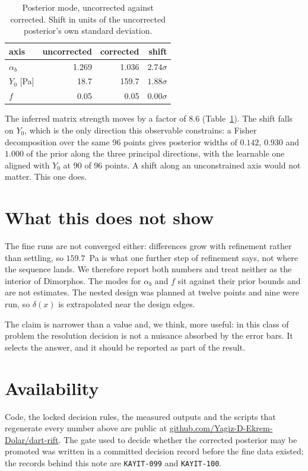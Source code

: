 \documentclass[10pt,twocolumn]{article}
\begin{document}
\begin{table}[t]
\centering\small
\caption{Posterior mode, uncorrected against corrected. Shift in units
of the uncorrected posterior's own standard deviation.}
\label{tab:mode}
\begin{tabular}{lrrr}
\toprule
axis & uncorrected & corrected & shift \\
\midrule
$\alpha_b$          & 1.269 & 1.036 & $2.74\sigma$ \\
$Y_0$ [Pa]          & 18.7  & 159.7 & $1.88\sigma$ \\
$f$                 & 0.05  & 0.05  & $0.00\sigma$ \\
\bottomrule
\end{tabular}
\end{table}

The inferred matrix strength moves by a factor of $8.6$
(Table~\ref{tab:mode}). The shift falls on $Y_0$, which is the only
direction this observable constrains: a Fisher decomposition over the
same 96 points gives posterior widths of $0.142$, $0.930$ and $1.000$
of the prior along the three principal directions, with the learnable
one aligned with $Y_0$ at $90$ of $96$ points. A shift along an
unconstrained axis would not matter. This one does.

\section{What this does not show}

The fine runs are not converged either: differences grow with
refinement rather than settling, so $159.7$~Pa is what one further
step of refinement says, not where the sequence lands. We therefore
report both numbers and treat neither as the interior of Dimorphos.
The modes for $\alpha_b$ and $f$ sit against their prior bounds and
are not estimates. The nested design was planned at twelve points and
nine were run, so $\delta(x)$ is extrapolated near the design edges.

The claim is narrower than a value and, we think, more useful: in this
class of problem the resolution decision is not a nuisance absorbed by
the error bars. It selects the answer, and it should be reported as
part of the result.

\section{Availability}

Code, the locked decision rules, the measured outputs and the scripts
that regenerate every number above are public at
\href{https://github.com/Yagiz-D-Ekrem-Dolar/dart-rift}{github.com/Yagiz-D-Ekrem-Dolar/dart-rift}.
The gate used to decide whether the corrected posterior may be
promoted was written in a committed decision record before the fine
data existed; the records behind this note are \texttt{KAYIT-099} and
\texttt{KAYIT-100}.
\end{document}
